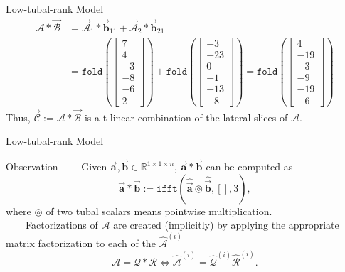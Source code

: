 \documentclass[t, 10pt, handout, aspectratio=169]{beamer}
\begin{document}
\begin{frame}{Low-tubal-rank Model}
$$
\begin{aligned}
\mathcal{A}*\vec{\mathcal{B}} & = \vec{\mathcal{A}}_1 * \vec{\mathbf{b}}_{11} + \vec{\mathcal{A}}_2 * \vec{\mathbf{b}}_{21} \\
& = \texttt{fold}\left(
\left[\begin{array}{c}
7\\
4\\
-3\\
\hline
-8\\
-6\\
2
\end{array}\right]
\right) + \texttt{fold}\left(
\left[\begin{array}{c}
-3\\
-23\\
0\\
\hline
-1\\
-13\\
-8
\end{array}\right]
\right)=\texttt{fold}\left(
\left[\begin{array}{c}
4\\
-19\\
-3\\
\hline
-9\\
-19\\
-6
\end{array}\right]
\right)
\end{aligned}
$$
Thus, $\vec{\mathcal{C}} := \mathcal{A} * \vec{\mathcal{B}}$ is a t-linear combination of the lateral slices of $\mathcal{A}$.
\end{frame}

\begin{frame}{Low-tubal-rank Model}

\begin{block}{Observation}
~~~~Given $\vec{\mathbf{a}}, \vec{\mathbf{b}} \in \mathbb{R}^{1\times 1\times n}$, $\vec{\mathbf{a}} * \vec{\mathbf{b}}$ can be computed as
$$
\vec{\mathbf{a}} * \vec{\mathbf{b}} := \texttt{ifft}(\hat{\vec{\mathbf{a}}} \circledcirc \hat{\vec{\mathbf{b}}}, [], 3),
$$
where $\circledcirc$ of two tubal scalars means pointwise multiplication.\\
~~~~Factorizations of $\mathcal{A}$ are created (implicitly) by applying the appropriate matrix factorization to each of the $\hat{\mathcal{A}}^{(i)}$
$$
\mathcal{A}=\mathcal{Q} * \mathcal{R} \Longleftrightarrow \hat{\mathcal{A}}^{(i)}=\hat{\mathcal{Q}}^{(i)}\hat{\mathcal{R}}^{(i)}.
$$
\end{block}
\end{frame}
\end{document}
